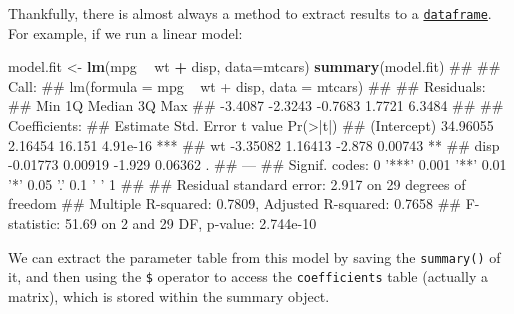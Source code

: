 \documentclass[]{article}
\newenvironment{Shaded}{\begin{snugshade}}{\end{snugshade}}
\newcommand{\KeywordTok}[1]{\textcolor[rgb]{0.13,0.29,0.53}{\textbf{#1}}}
\newcommand{\DataTypeTok}[1]{\textcolor[rgb]{0.13,0.29,0.53}{#1}}
\newcommand{\StringTok}[1]{\textcolor[rgb]{0.31,0.60,0.02}{#1}}
\newcommand{\OperatorTok}[1]{\textcolor[rgb]{0.81,0.36,0.00}{\textbf{#1}}}
\newcommand{\NormalTok}[1]{#1}
\theoremstyle{definition}
\theoremstyle{definition}
\theoremstyle{definition}
\theoremstyle{remark}
\begin{document}
Thankfully, there is almost always a method to extract results to a
\protect\hyperlink{datasets-dataframes}{\texttt{dataframe}}. For
example, if we run a linear model:

\begin{Shaded}
\begin{Highlighting}[]
\NormalTok{model.fit <-}\StringTok{ }\KeywordTok{lm}\NormalTok{(mpg }\OperatorTok{~}\StringTok{ }\NormalTok{wt }\OperatorTok{+}\StringTok{ }\NormalTok{disp, }\DataTypeTok{data=}\NormalTok{mtcars)}
\KeywordTok{summary}\NormalTok{(model.fit)}
\NormalTok{## }
\NormalTok{## Call:}
\NormalTok{## lm(formula = mpg ~ wt + disp, data = mtcars)}
\NormalTok{## }
\NormalTok{## Residuals:}
\NormalTok{##     Min      1Q  Median      3Q     Max }
\NormalTok{## -3.4087 -2.3243 -0.7683  1.7721  6.3484 }
\NormalTok{## }
\NormalTok{## Coefficients:}
\NormalTok{##             Estimate Std. Error t value Pr(>|t|)    }
\NormalTok{## (Intercept) 34.96055    2.16454  16.151 4.91e-16 ***}
\NormalTok{## wt          -3.35082    1.16413  -2.878  0.00743 ** }
\NormalTok{## disp        -0.01773    0.00919  -1.929  0.06362 .  }
\NormalTok{## ---}
\NormalTok{## Signif. codes:  0 '***' 0.001 '**' 0.01 '*' 0.05 '.' 0.1 ' ' 1}
\NormalTok{## }
\NormalTok{## Residual standard error: 2.917 on 29 degrees of freedom}
\NormalTok{## Multiple R-squared:  0.7809, Adjusted R-squared:  0.7658 }
\NormalTok{## F-statistic: 51.69 on 2 and 29 DF,  p-value: 2.744e-10}
\end{Highlighting}
\end{Shaded}

We can extract the parameter table from this model by saving the
\texttt{summary()} of it, and then using the \texttt{\$} operator to
access the \texttt{coefficients} table (actually a matrix), which is
stored within the summary object.

\begin{Shaded}
\end{Shaded}
\end{document}

